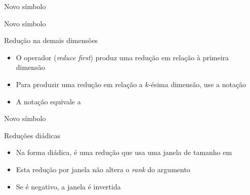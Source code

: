 \begin{frame}[fragile]{Novo símbolo}


\end{frame}

\begin{frame}[fragile]{Novo símbolo}


\end{frame}


\begin{frame}[fragile]{Redução na demais dimensões}

    \begin{itemize}
        \item  O operador  (\textit{reduce first}) produz uma redução em relação à primeira dimensão
        \pause
        
        \item Para produzir uma redução em relação a $k$-ésima dimensão, use a notação 
        \pause

        \item A notação  equivale a 
    \end{itemize}

\end{frame}

\begin{frame}[fragile]{Novo símbolo}


\end{frame}

\begin{frame}[fragile]{Reduções diádicas}

    \begin{itemize}
        \item Na forma diádica,  é uma redução que usa uma janela de tamanho
             em 
        \pause

        \item Esta redução por janela não altera o \textit{rank} do argumento
        \pause

        \item Se  é negativo, a janela é invertida    
    \end{itemize}

\end{frame}

